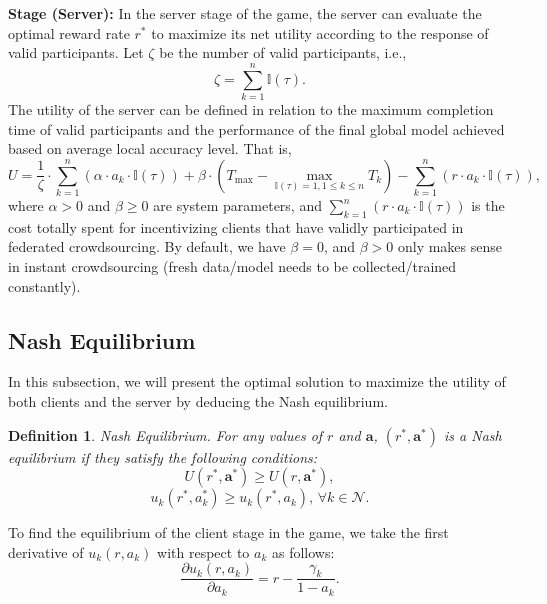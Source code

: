\documentclass[final,1p,times]{elsarticle}
\newtheorem{myDef}{Definition}
\begin{document}
\textbf{Stage \uppercase\expandafter{} (Server):} In the server stage of the game, the server can evaluate the optimal reward rate $r^\ast$ to maximize its net utility according to the response of valid participants. Let $\zeta$ be the number of valid participants, i.e.,
\begin{equation}
	\zeta = \sum_{k=1}^n\mathbb{I}(\tau).
\end{equation}
The utility of the server can be defined in relation to the maximum completion time of valid participants and the performance of the final global model achieved based on average local accuracy level. That is, 
\begin{equation}\label{Eq:server-u}
	U = \frac{1}{\zeta}\cdot \sum_{k=1}^n\left(\alpha\cdot a_k\cdot \mathbb{I}(\tau)\right) + \beta\cdot(T_{\max}-\max_{\mathbb{I}(\tau)=1,1\le k\le n}T_k) - \sum_{k=1}^n\left(r\cdot a_k\cdot \mathbb{I}(\tau)\right),
\end{equation}
where $\alpha > 0$ and $\beta \ge 0$ are system parameters, and $\sum_{k=1}^n(r\cdot a_k\cdot \mathbb{I}(\tau))$ is the cost totally spent for incentivizing clients that have validly participated in federated crowdsourcing. By default, we have $\beta = 0$, and $\beta > 0$ only makes sense in instant crowdsourcing (fresh data/model needs to be collected/trained constantly).

\subsection{Nash Equilibrium}
In this subsection, we will present the optimal solution to maximize the utility of both clients and the server by deducing the Nash equilibrium.

\begin{myDef}
	Nash Equilibrium. For any values of $r$ and $\bm{a}$, $(r^\ast,\bm{a}^\ast)$ is a Nash equilibrium if they satisfy the following conditions:
	\begin{equation}
		U(r^\ast,\bm{a}^\ast) \ge U(r,\bm{a}^\ast),
	\end{equation}	
	\begin{equation}
		u_k(r^\ast,a_k^\ast) \ge u_k(r^\ast,a_k),\, \forall k \in \bm{\mathcal{N}}.
	\end{equation}	
\end{myDef}

To find the equilibrium of the client stage in the game, we take the first derivative of $u_k(r,a_k)$ with respect to $a_k$ as follows:
\begin{equation}
	\frac{\partial u_k(r,a_k)}{\partial a_k} = r-\frac{\gamma_k}{1-a_k}.
\end{equation}	
\end{document}
